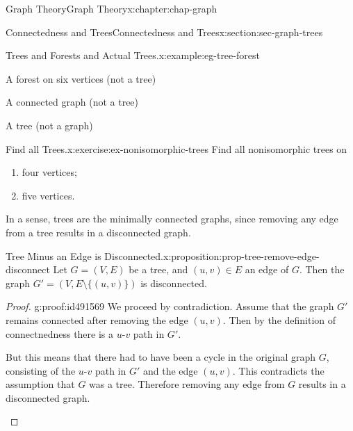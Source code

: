\documentclass[oneside,10pt,]{book}
\numberwithin{equation}{section}
\begin{document}
\begin{chapterptx}{Graph Theory}{}{Graph Theory}{}{}{x:chapter:chap-graph}
\begin{sectionptx}{Connectedness and Trees}{}{Connectedness and Trees}{}{}{x:section:sec-graph-trees}
\begin{example}{Trees and Forests and Actual Trees.}{x:example:eg-tree-forest}
\begin{sidebyside}{4}{0.0275}{0.0275}{0.055}
\begin{sbspanel}{0.2}
A forest on six vertices (not a tree)%
\end{sbspanel}%
\begin{sbspanel}{0.2}%
\par
A connected graph (not a tree)%
\end{sbspanel}%
\begin{sbspanel}{0.18}%
\par
A tree (not a graph)%
\end{sbspanel}%
\end{sidebyside}%
\end{example}
\begin{inlineexercise}{Find all Trees.}{x:exercise:ex-nonisomorphic-trees}%
Find all nonisomorphic trees on%
\begin{enumerate}[label=(\alph*)]
\item{}four vertices;%
\item{}five vertices.%
\end{enumerate}
%
\end{inlineexercise}
In a sense, trees are the minimally connected graphs, since removing any edge from a tree results in a disconnected graph.%
\begin{proposition}{Tree Minus an Edge is Disconnected.}{}{x:proposition:prop-tree-remove-edge-disconnect}%
Let \(G = (V,E)\) be a tree, and \((u,v) \in E\) an edge of \(G\). Then the graph \(G' = \left(V, E \setminus \{(u,v)\}\right)\) is disconnected.%
\end{proposition}
\begin{proof}{}{g:proof:id491569}
We proceed by contradiction. Assume that the graph \(G'\) remains connected after removing the edge \((u,v)\). Then by the definition of connectnedness there is a \(u\)-\(v\) path in \(G'\).%
\begin{sidebyside}{2}{0}{0}{0.07}%
\begin{sbspanel}{0.75}%
But this means that there had to have been a cycle in the original graph \(G\), consisting of the \(u\)-\(v\) path in \(G'\) and the edge \((u,v)\). This contradicts the assumption that \(G\) was a tree. Therefore removing any edge from \(G\) results in a disconnected graph.%
\end{sbspanel}%
\begin{sbspanel}{0.18}%
\end{sbspanel}
\end{sidebyside}
\end{proof}
\end{sectionptx}
\end{chapterptx}
\end{document}
